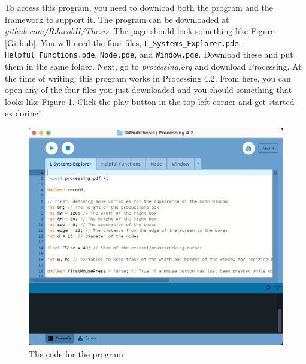 \documentclass[12pt,twoside]{reedthesis}
\newcommand{\code}[1]{\texttt{#1}}
\begin{document}
	To access this program, you need to download both the program and the framework to support it. The program can be downloaded at \textit{github.com/RJacobH/Thesis}. The page should look something like Figure \ref{Github}. You will need the four files, \code{L\_Systems\_Explorer.pde}, \code{Helpful\_Functions.pde}, \code{Node.pde}, and \code{Window.pde}. Download these and put them in the same folder. Next, go to \textit{processing.org} and download Processing. At the time of writing, this program works in Processing 4.2. From here, you can open any of the four files you just downloaded and you should something that looks like Figure \ref{OpenProgram}. Click the play button in the top left corner and get started exploring!\\
	
	
	\begin{figure}[h]
	\centering
	\includegraphics[scale=0.35]{Images/OpenProgram}
	\caption{The code for the program}
	\label {OpenProgram}
	\end{figure}
	
\end{document}
